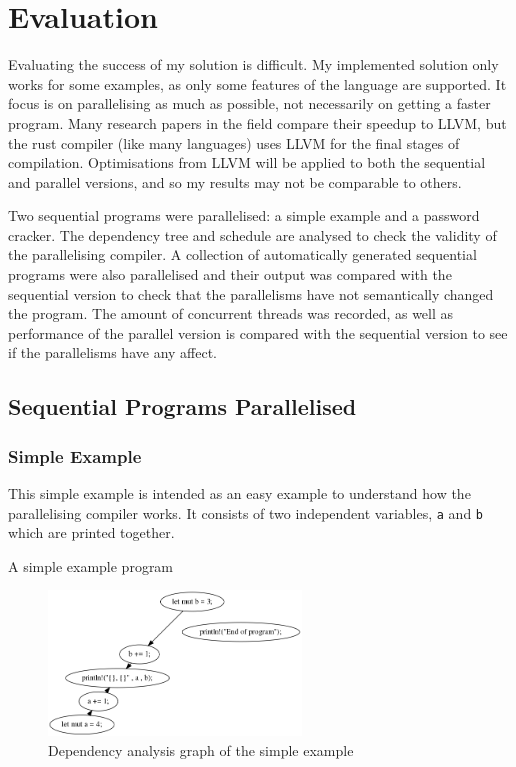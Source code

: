 \chapter{Evaluation}
\label{sec:evaluation}
Evaluating the success of my solution is difficult. My implemented solution only works for some examples, as only some features of the language are supported. It focus is on parallelising as much as possible, not necessarily on getting a faster program.  Many research papers in the field compare their speedup to LLVM, but the rust compiler (like many languages) uses LLVM for the final stages of compilation. Optimisations from LLVM will be applied to both the sequential and parallel versions, and so my results may not be comparable to others.

Two sequential programs were parallelised: a simple example and a password cracker. The dependency tree and schedule are analysed to check the validity of the parallelising compiler. A collection of automatically generated sequential programs were also parallelised and their output was compared with the sequential version to check that the parallelisms have not semantically changed the program. The amount of concurrent threads was recorded, as well as performance of the parallel version is compared with the sequential version to see if the parallelisms have any affect.

\section{Sequential Programs Parallelised}
\subsection{Simple Example}
This simple example is intended as an easy example to understand how the parallelising compiler works. It consists of two independent variables, \texttt{a} and \texttt{b} which are printed together.

\begin{code}
    \caption{A simple example program}
\end{code}

\begin{figure}[H]
    \centering
    \includegraphics[width=0.6\textwidth]{img/simple-example/main-dependency-analysis.png}
    \caption{Dependency analysis graph of the simple example}
\end{figure}

